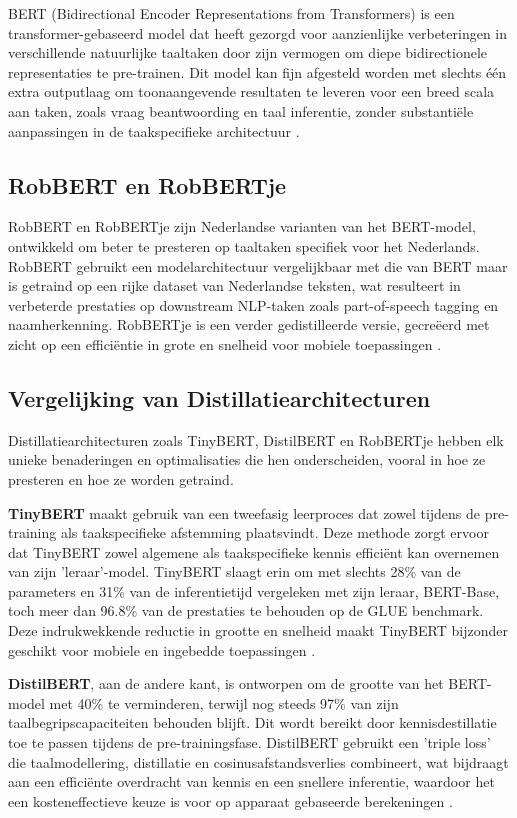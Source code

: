BERT (Bidirectional Encoder Representations from Transformers) is een trans\-for\-mer-gebaseerd model dat heeft gezorgd voor aanzienlijke verbeteringen in verschillende natuurlijke taaltaken door zijn vermogen om diepe bidirectionele representaties te pre-trainen. Dit model kan fijn afgesteld worden met slechts één extra outputlaag om toonaangevende resultaten te leveren voor een breed scala aan taken, zoals vraag beantwoording en taal inferentie, zonder substantiële aanpassingen in de taakspecifieke architectuur \autocite{Devlin2019}.

\subsection{RobBERT en RobBERTje}

RobBERT en RobBERTje zijn Nederlandse varianten van het BERT-model, ontwikkeld om beter te presteren op taaltaken specifiek voor het Nederlands. RobBERT gebruikt een modelarchitectuur vergelijkbaar met die van BERT maar is getraind op een rijke dataset van Nederlandse teksten, wat resulteert in verbeterde prestaties op downstream NLP-taken zoals part-of-speech tagging en naamherkenning. RobBERTje is een verder gedistilleerde versie, gecreëerd met zicht op een efficiëntie in grote en snelheid voor mobiele toepassingen \autocite{Vries2019}.

\subsection{Vergelijking van Distillatiearchitecturen}

Distillatiearchitecturen zoals TinyBERT, DistilBERT en RobBERTje hebben elk unie\-ke benaderingen en optimalisaties die hen onderscheiden, vooral in hoe ze presteren en hoe ze worden getraind.

\textbf{TinyBERT} maakt gebruik van een tweefasig leerproces dat zowel tijdens de pre-training als taakspecifieke afstemming plaatsvindt. Deze methode zorgt ervoor dat TinyBERT zowel algemene als taakspecifieke kennis efficiënt kan overnemen van zijn 'leraar'-model. TinyBERT slaagt erin om met slechts 28\% van de parameters en 31\% van de inferentietijd vergeleken met zijn leraar, BERT-Base, toch meer dan 96.8\% van de prestaties te behouden op de GLUE benchmark. Deze indrukwekkende reductie in grootte en snelheid maakt TinyBERT bijzonder geschikt voor mobiele en ingebedde toepassingen \autocite{Jiao2019TinyBERT}.

\textbf{DistilBERT}, aan de andere kant, is ontworpen om de grootte van het BERT-model met 40\% te verminderen, terwijl nog steeds 97\% van zijn taalbegripscapaciteiten behouden blijft. Dit wordt bereikt door kennisdestillatie toe te passen tijdens de pre-trainingsfase. DistilBERT gebruikt een 'triple loss' die taalmodellering, distillatie en cosinusafstandsverlies combineert, wat bijdraagt aan een efficiënte overdracht van kennis en een snellere inferentie, waardoor het een kosteneffectieve keuze is voor op apparaat gebaseerde berekeningen \autocite{Sanh2019DistilBERT}.

